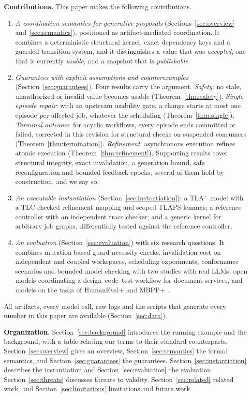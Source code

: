 \textbf{Contributions.} This paper makes the following contributions.
\begin{enumerate}
\item \emph{A coordination semantics for generative proposals} (Sections~\ref{sec:overview} and~\ref{sec:semantics}), positioned as artifact-mediated coordination. It combines a deterministic structural kernel, exact dependency keys and a guarded transition system, and it distinguishes a value that was \emph{accepted}, one that is currently \emph{usable}, and a snapshot that is \emph{publishable}.
\item \emph{Guarantees with explicit assumptions and counterexamples} (Section~\ref{sec:guarantees}). Four results carry the argument. \emph{Safety}: no stale, unauthorized or invalid value becomes usable (Theorem~\ref{thm:safety}). \emph{Single-episode repair}: with an upstream usability gate, a change starts at most one episode per affected job, whatever the scheduling (Theorem~\ref{thm:single}). \emph{Terminal outcome}: for acyclic workflows, every episode ends committed or failed, corrected in this revision for structural checks on suspended consumers (Theorem~\ref{thm:termination}). \emph{Refinement}: asynchronous execution refines atomic execution (Theorem~\ref{thm:refinement}). Supporting results cover structural integrity, exact invalidation, a generation bound, safe reconfiguration and bounded feedback epochs; several of them hold by construction, and we say so.
\item \emph{An executable instantiation} (Section~\ref{sec:instantiation}): a TLA$^+$ model with a TLC-checked refinement mapping and scoped TLAPS lemmas; a reference controller with an independent trace checker; and a generic kernel for arbitrary job graphs, differentially tested against the reference controller.
\item \emph{An evaluation} (Section~\ref{sec:evaluation}) with six research questions. It combines mutation-based guard-necessity checks, invalidation cost on independent and coupled workspaces, scheduling experiments, conformance scenarios and bounded model checking with two studies with real LLMs: \LlmModelsN{} open models coordinating a design--code--test workflow for document services, and \BenchModelsN{} models on the \BenchTasks{} tasks of HumanEval+ and MBPP+~\cite{evalplus}.
\end{enumerate}
All artifacts, every model call, raw logs and the scripts that generate every number in this paper are available (Section~\ref{sec:data}).

\textbf{Organization.} Section~\ref{sec:background} introduces the running example and the background, with a table relating our terms to their standard counterparts. Section~\ref{sec:overview} gives an overview, Section~\ref{sec:semantics} the formal semantics, and Section~\ref{sec:guarantees} the guarantees. Section~\ref{sec:instantiation} describes the instantiation and Section~\ref{sec:evaluation} the evaluation. Section~\ref{sec:threats} discusses threats to validity, Section~\ref{sec:related} related work, and Section~\ref{sec:limitations} limitations and future work.
